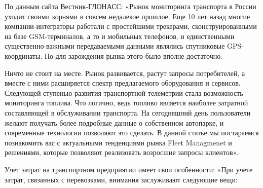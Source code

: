 \documentclass{lstu-diploma}
\begin{document}
По данным сайта Вестник-ГЛОНАСС: «Рынок мониторинга транспорта в России уходит
своими корнями в совсем недалекое прошлое. Еще 10 лет назад многие
компании-интеграторы работали с простейшими трекерами, сконструированными на
базе GSM-терминалов, а то и мобильных телефонов, и единственными
существенно-важными передаваемыми данными являлись спутниковые GPS-координаты.
Но для зарождения рынка этого было вполне достаточно.

Ничто не стоит на месте. Рынок развивается, растут запросы потребителей, а
вместе с ними расширяется спектр предлагаемого оборудования и сервисов.
Следующей ступенью развития транспортной телеметрии стала возможность
мониторинга топлива. Что логично, ведь топливо является наиболее затратной
составляющей в обслуживании транспорта. На сегодняшний день пользователи желают
получать более подробные данные о собственном автопарке, и современные
технологии позволяют это сделать. В данной статье мы постараемся познакомить вас
с актуальными тенденциями рынка Fleet Managmenet и решениями, которые позволяют
реализовать возросшие запросы клиентов».

Учет затрат на транспортном предприятии имеет свои особенности: «При учете
затрат, связанных с перевозками, внимания заслуживают следующие вещи:
\end{document}

